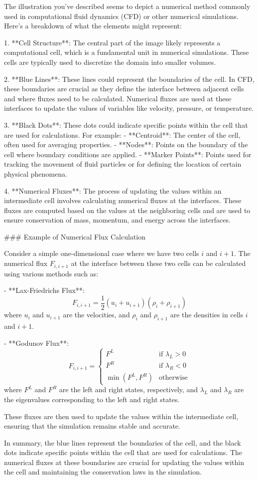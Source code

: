 The illustration you've described seems to depict a numerical method commonly used in computational fluid dynamics (CFD) or other numerical simulations. Here’s a breakdown of what the elements might represent:

1. **Cell Structure**: The central part of the image likely represents a computational cell, which is a fundamental unit in numerical simulations. These cells are typically used to discretize the domain into smaller volumes.

2. **Blue Lines**: These lines could represent the boundaries of the cell. In CFD, these boundaries are crucial as they define the interface between adjacent cells and where fluxes need to be calculated. Numerical fluxes are used at these interfaces to update the values of variables like velocity, pressure, or temperature.

3. **Black Dots**: These dots could indicate specific points within the cell that are used for calculations. For example:
   - **Centroid**: The center of the cell, often used for averaging properties.
   - **Nodes**: Points on the boundary of the cell where boundary conditions are applied.
   - **Marker Points**: Points used for tracking the movement of fluid particles or for defining the location of certain physical phenomena.

4. **Numerical Fluxes**: The process of updating the values within an intermediate cell involves calculating numerical fluxes at the interfaces. These fluxes are computed based on the values at the neighboring cells and are used to ensure conservation of mass, momentum, and energy across the interfaces.

### Example of Numerical Flux Calculation

Consider a simple one-dimensional case where we have two cells \(i\) and \(i+1\). The numerical flux \(F_{i,i+1}\) at the interface between these two cells can be calculated using various methods such as:

- **Lax-Friedrichs Flux**: 
  \[
  F_{i,i+1} = \frac{1}{2} \left( u_i + u_{i+1} \right) \left( \rho_i + \rho_{i+1} \right)
  \]
  where \(u_i\) and \(u_{i+1}\) are the velocities, and \(\rho_i\) and \(\rho_{i+1}\) are the densities in cells \(i\) and \(i+1\).

- **Godunov Flux**:
  \[
  F_{i,i+1} = \begin{cases}
  F^L & \text{if } \lambda_L > 0 \\
  F^R & \text{if } \lambda_R < 0 \\
  \min(F^L, F^R) & \text{otherwise}
  \end{cases}
  \]
  where \(F^L\) and \(F^R\) are the left and right states, respectively, and \(\lambda_L\) and \(\lambda_R\) are the eigenvalues corresponding to the left and right states.

These fluxes are then used to update the values within the intermediate cell, ensuring that the simulation remains stable and accurate.

In summary, the blue lines represent the boundaries of the cell, and the black dots indicate specific points within the cell that are used for calculations. The numerical fluxes at these boundaries are crucial for updating the values within the cell and maintaining the conservation laws in the simulation.
